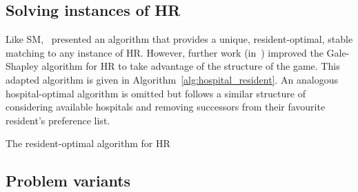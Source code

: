 \subsection{Solving instances of HR}

Like SM,~\cite{Gale1962} presented an algorithm that provides a unique,
resident-optimal, stable matching to any instance of HR. However, further work
(in~\cite{Dubins1981,Roth1984}) improved the Gale-Shapley algorithm for HR to
take advantage of the structure of the game. This adapted algorithm is given in
Algorithm~\ref{alg:hospital_resident}. An analogous hospital-optimal algorithm
is omitted but follows a similar structure of considering available hospitals
and removing successors from their favourite resident's preference list.

\balg%
\caption{The resident-optimal algorithm for HR}\label{alg:hospital_resident}

\vspace{1em}


\ealg%

\subsection{Problem variants}

